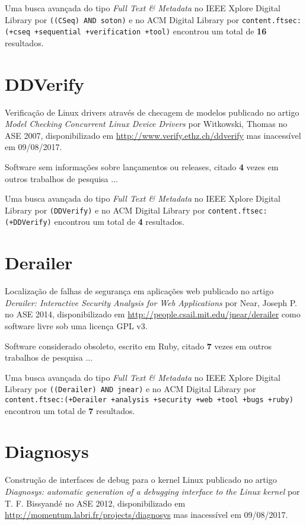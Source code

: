 Uma busca avançada do tipo {\it Full Text \& Metadata} no IEEE Xplore Digital Library por
\texttt{((CSeq) AND soton)}
e no ACM Digital Library por
\texttt{content.ftsec:(+cseq +sequential +verification +tool)}
encontrou um total de
{\bf 16}
resultados.

\section{DDVerify}

Verificação de Linux drivers através de checagem de modelos
publicado no artigo {\it Model Checking Concurrent Linux Device Drivers}
por Witkowski, Thomas
no ASE 2007,
disponibilizado em \url{http://www.verify.ethz.ch/ddverify}
mas inacessível em 09/08/2017.

Software sem informações sobre lançamentos ou releases,
citado {\bf 4} vezes em outros trabalhos de pesquisa ...

Uma busca avançada do tipo {\it Full Text \& Metadata} no IEEE Xplore Digital Library por
\texttt{(DDVerify)}
e no ACM Digital Library por
\texttt{content.ftsec:(+DDVerify)}
encontrou um total de
{\bf 4}
resultados.

\section{Derailer}

Localização de falhas de segurança em aplicações web
publicado no artigo {\it Derailer: Interactive Security Analysis for Web Applications}
por Near, Joseph P.
no ASE 2014,
disponibilizado em \url{http://people.csail.mit.edu/jnear/derailer}
como software livre
sob uma licença GPL v3.

Software considerado obsoleto,
escrito em Ruby,
citado {\bf 7} vezes em outros trabalhos de pesquisa ...

Uma busca avançada do tipo {\it Full Text \& Metadata} no IEEE Xplore Digital Library por
\texttt{((Derailer) AND jnear)}
e no ACM Digital Library por
\texttt{content.ftsec:(+Derailer +analysis +security +web +tool +bugs +ruby)}
encontrou um total de
{\bf 7}
resultados.

\section{Diagnosys}

Construção de interfaces de debug para o kernel Linux
publicado no artigo {\it Diagnosys: automatic generation of a debugging interface to the Linux kernel}
por T. F. Bissyandé
no ASE 2012,
disponibilizado em \url{http://momentum.labri.fr/projects/diagnosys}
mas inacessível em 09/08/2017.

